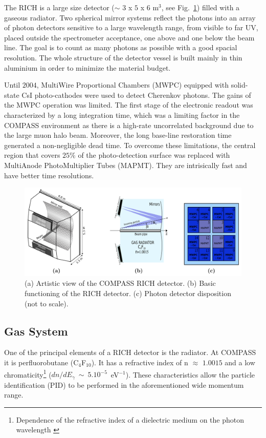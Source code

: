 The RICH is a large size detector ($\sim$ $3$ x $5$ x $6$ m$^3$, see Fig.~\ref{pic:RICHview}) filled with a gaseous radiator. Two spherical mirror systems reflect the photons into an array of photon detectors sensitive to a large wavelength range, from visible to far UV, placed outside the spectrometer acceptance, one above and one below the beam line. The goal is to count as many photons as possible with a good spacial resolution. The whole structure of the detector vessel is built mainly in thin aluminium in order to minimize the material budget.

Until $2004$, MultiWire Proportional Chambers (MWPC) equipped with solid-state CsI photo-cathodes were used to detect Cherenkov photons. The gains of the MWPC operation was limited. The first stage of the electronic readout was characterized by a long integration time, which was a limiting factor in the COMPASS environment as there is a high-rate uncorrelated background due to the large muon halo beam. Moreover, the long base-line restoration time generated a non-negligible dead time. To overcome these limitations, the central region that covers $25$\% of the photo-detection surface was replaced with MultiAnode PhotoMultiplier Tubes (MAPMT). They are intrisically fast and have better time resolutions.

\begin{figure}[!h]
  \centering
	\includegraphics[scale=0.4]{./gfx/RICHview.png}
	\caption{(a) Artistic view of the COMPASS RICH detector. (b) Basic functioning of the RICH detector. (c) Photon detector disposition (not to scale).}
	\label{pic:RICHview}
\end{figure}

\subsection{Gas System}

One of the principal elements of a RICH detector is the radiator. At COMPASS it is perfluorobutane (C$_4$F$_{10}$). It has a refractive index of n $\approx$ $1.0015$ and a low chromaticity\footnote{Dependence of the refractive index of a dielectric medium on the photon wavelength \cite{Dispersion}} ($dn/dE_{\gamma}$~$\sim$~$5.10^{-5}$~eV$^{-1}$). These characteristics allow the particle identification (PID) to be performed in the aforementioned wide momentum range.

